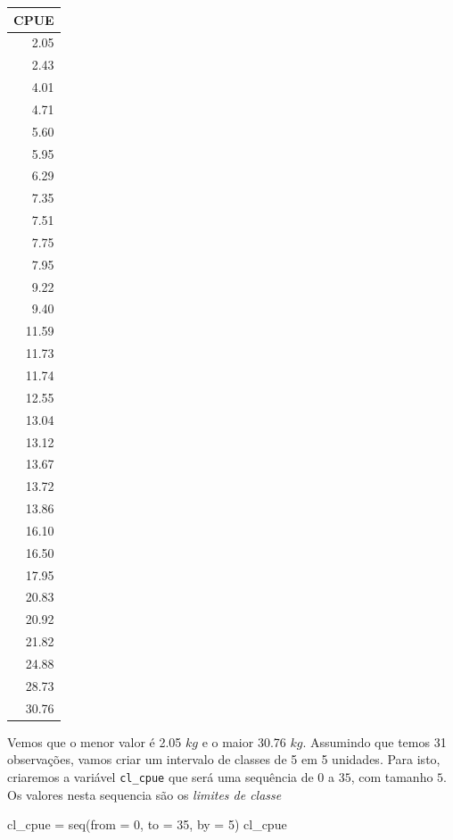 \documentclass[
]{book}
\newenvironment{Shaded}{\begin{snugshade}}{\end{snugshade}}
\newcommand{\AttributeTok}[1]{\textcolor[rgb]{0.77,0.63,0.00}{#1}}
\newcommand{\DecValTok}[1]{\textcolor[rgb]{0.00,0.00,0.81}{#1}}
\newcommand{\FunctionTok}[1]{\textcolor[rgb]{0.00,0.00,0.00}{#1}}
\newcommand{\NormalTok}[1]{#1}
\newcommand{\OtherTok}[1]{\textcolor[rgb]{0.56,0.35,0.01}{#1}}
\begin{document}
\begin{tabular}{r}
\hline
CPUE\\
\hline
2.05\\
\hline
2.43\\
\hline
4.01\\
\hline
4.71\\
\hline
5.60\\
\hline
5.95\\
\hline
6.29\\
\hline
7.35\\
\hline
7.51\\
\hline
7.75\\
\hline
7.95\\
\hline
9.22\\
\hline
9.40\\
\hline
11.59\\
\hline
11.73\\
\hline
11.74\\
\hline
12.55\\
\hline
13.04\\
\hline
13.12\\
\hline
13.67\\
\hline
13.72\\
\hline
13.86\\
\hline
16.10\\
\hline
16.50\\
\hline
17.95\\
\hline
20.83\\
\hline
20.92\\
\hline
21.82\\
\hline
24.88\\
\hline
28.73\\
\hline
30.76\\
\hline
\end{tabular}

Vemos que o menor valor é 2.05 \(kg\) e o maior 30.76 \(kg\). Assumindo que temos 31 observações, vamos criar um intervalo de classes de 5 em 5 unidades. Para isto, criaremos a variável \texttt{cl\_cpue} que será uma sequência de \(0\) a \(35\), com tamanho \(5\). Os valores nesta sequencia são os \emph{limites de classe}

\begin{Shaded}
\begin{Highlighting}[]
\NormalTok{cl\_cpue }\OtherTok{=} \FunctionTok{seq}\NormalTok{(}\AttributeTok{from =} \DecValTok{0}\NormalTok{, }\AttributeTok{to =} \DecValTok{35}\NormalTok{, }\AttributeTok{by =} \DecValTok{5}\NormalTok{)}
\NormalTok{cl\_cpue}
\end{Highlighting}
\end{Shaded}
\end{document}
